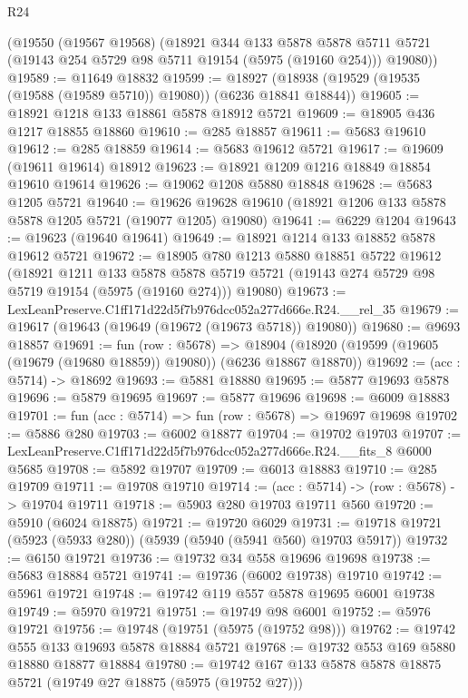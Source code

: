 \begin{lexlean}{R24}
\begin{coremodule}
    (@19550
      (@19567 @19568)
      (@18921
        @344
        @133
        @5878
        @5878
        @5711
        @5721
        (@19143 @254 @5729 @98 @5711 @19154 (@5975 (@19160 @254)))
        @19080))
@19589 := @11649 @18832
@19599 := @18927 (@18938 (@19529 (@19535 (@19588 (@19589 @5710)) @19080)) (@6236 @18841 @18844))
@19605 := @18921 @1218 @133 @18861 @5878 @18912 @5721
@19609 := @18905 @436 @1217 @18855 @18860
@19610 := @285 @18857
@19611 := @5683 @19610
@19612 := @285 @18859
@19614 := @5683 @19612 @5721
@19617 := @19609 (@19611 @19614) @18912
@19623 := @18921 @1209 @1216 @18849 @18854 @19610 @19614
@19626 := @19062 @1208 @5880 @18848
@19628 := @5683 @1205 @5721
@19640 := @19626 @19628 @19610 (@18921 @1206 @133 @5878 @5878 @1205 @5721 (@19077 @1205) @19080)
@19641 := @6229 @1204
@19643 := @19623 (@19640 @19641)
@19649 := @18921 @1214 @133 @18852 @5878 @19612 @5721
@19672 := @18905
    @780
    @1213
    @5880
    @18851
    @5722
    @19612
    (@18921
      @1211
      @133
      @5878
      @5878
      @5719
      @5721
      (@19143 @274 @5729 @98 @5719 @19154 (@5975 (@19160 @274)))
      @19080)
@19673 := LexLeanPreserve.C1ff171d22d5f7b976dcc052a277d666e.R24.__rel_35
@19679 := @19617 (@19643 (@19649 (@19672 (@19673 @5718)) @19080))
@19680 := @9693 @18857
@19691 := fun (row : @5678) =>
  @18904 (@18920 (@19599 (@19605 (@19679 (@19680 @18859)) @19080)) (@6236 @18867 @18870))
@19692 := (acc : @5714) -> @18692
@19693 := @5881 @18880
@19695 := @5877 @19693 @5878
@19696 := @5879 @19695
@19697 := @5877 @19696
@19698 := @6009 @18883
@19701 := fun (acc : @5714) => fun (row : @5678) => @19697 @19698
@19702 := @5886 @280
@19703 := @6002 @18877
@19704 := @19702 @19703
@19707 := LexLeanPreserve.C1ff171d22d5f7b976dcc052a277d666e.R24.__fits_8 @6000 @5685
@19708 := @5892 @19707
@19709 := @6013 @18883
@19710 := @285 @19709
@19711 := @19708 @19710
@19714 := (acc : @5714) -> (row : @5678) -> @19704 @19711
@19718 := @5903 @280 @19703 @19711 @560
@19720 := @5910 (@6024 @18875)
@19721 := @19720 @6029
@19731 := @19718 @19721 (@5923 (@5933 @280)) (@5939 (@5940 (@5941 @560) @19703 @5917))
@19732 := @6150 @19721
@19736 := @19732 @34 @558 @19696 @19698
@19738 := @5683 @18884 @5721
@19741 := @19736 (@6002 @19738) @19710
@19742 := @5961 @19721
@19748 := @19742 @119 @557 @5878 @19695 @6001 @19738
@19749 := @5970 @19721
@19751 := @19749 @98 @6001
@19752 := @5976 @19721
@19756 := @19748 (@19751 (@5975 (@19752 @98)))
@19762 := @19742 @555 @133 @19693 @5878 @18884 @5721
@19768 := @19732 @553 @169 @5880 @18880 @18877 @18884
@19780 := @19742 @167 @133 @5878 @5878 @18875 @5721 (@19749 @27 @18875 (@5975 (@19752 @27)))

\end{coremodule}
\end{lexlean}
